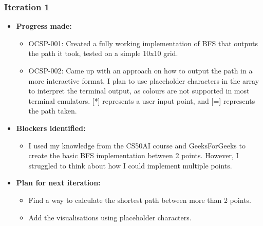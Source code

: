 \subsubsection{Iteration 1}
\begin{itemize}
    \item \textbf{Progress made:}
    \begin{itemize}
        \item OCSP-001: Created a fully working implementation of BFS that outputs the path it took, tested on a simple 10x10 grid.
        \item OCSP-002: Came up with an approach on how to output the path in a more interactive format. I plan to use placeholder characters in the array to interpret the terminal output, as colours are not supported in most terminal emulators. [*] represents a user input point, and [=] represents the path taken.
    \end{itemize}
    \item \textbf{Blockers identified:}
    \begin{itemize}
        \item I used my knowledge from the CS50AI course and GeeksForGeeks to create the basic BFS implementation between 2 points. However, I struggled to think about how I could implement multiple points.

    \end{itemize}
    \item \textbf{Plan for next iteration:}
    \begin{itemize}
        \item Find a way to calculate the shortest path between more than 2 points.
        \item Add the visualisations using placeholder characters.
    \end{itemize}
\end{itemize}

